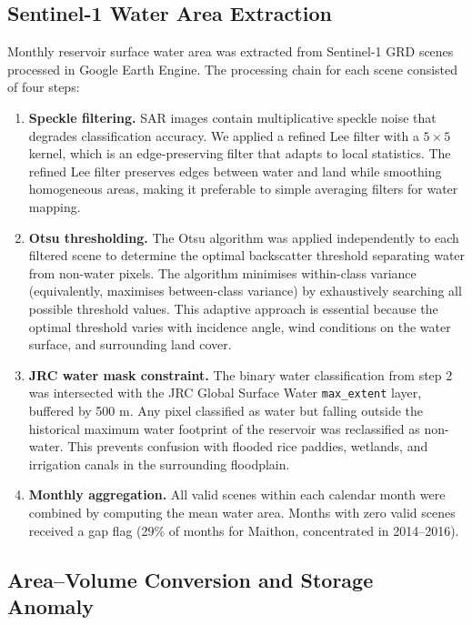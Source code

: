 \documentclass[12pt,a4paper,oneside]{report}
\begin{document}
\subsection{Sentinel-1 Water Area Extraction}

Monthly reservoir surface water area was extracted from Sentinel-1 GRD
scenes processed in Google Earth Engine. The processing chain for each
scene consisted of four steps:

\begin{enumerate}[leftmargin=*]
  \item \textbf{Speckle filtering.} SAR images contain multiplicative
    speckle noise that degrades classification accuracy. We applied a refined
    Lee filter with a $5 \times 5$ kernel, which is an edge-preserving filter
    that adapts to local statistics. The refined Lee filter preserves edges
    between water and land while smoothing homogeneous areas, making it
    preferable to simple averaging filters for water mapping.

  \item \textbf{Otsu thresholding.} The Otsu algorithm was applied
    independently to each filtered scene to determine the optimal
    backscatter threshold separating water from non-water pixels. The
    algorithm minimises within-class variance (equivalently, maximises
    between-class variance) by exhaustively searching all possible threshold
    values. This adaptive approach is essential because the optimal threshold
    varies with incidence angle, wind conditions on the water surface, and
    surrounding land cover.

  \item \textbf{JRC water mask constraint.} The binary water classification
    from step 2 was intersected with the JRC Global Surface Water
    \texttt{max\_extent} layer, buffered by 500 m. Any pixel classified as
    water but falling outside the historical maximum water footprint of the
    reservoir was reclassified as non-water. This prevents confusion with
    flooded rice paddies, wetlands, and irrigation canals in the surrounding
    floodplain.

  \item \textbf{Monthly aggregation.} All valid scenes within each calendar
    month were combined by computing the mean water area. Months with zero
    valid scenes received a gap flag (29\% of months for Maithon, concentrated
    in 2014--2016).
\end{enumerate}

\subsection{Area--Volume Conversion and Storage Anomaly}
\end{document}
